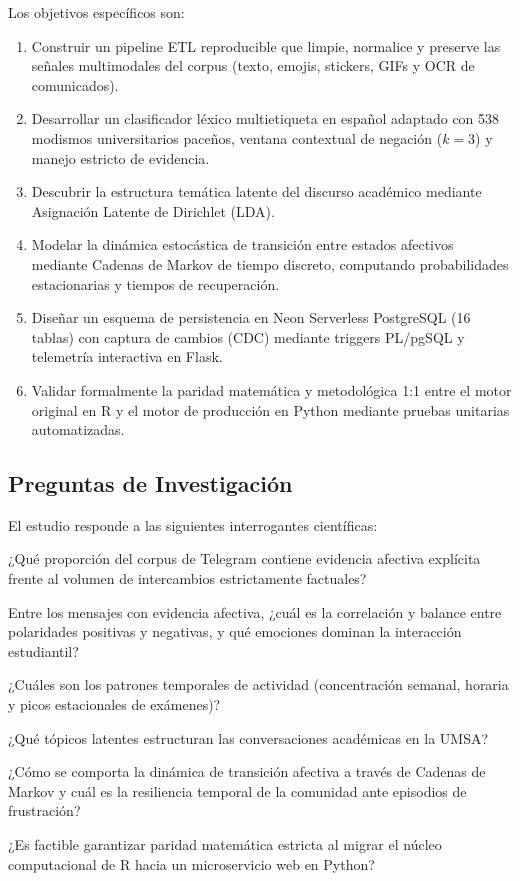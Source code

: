 Los objetivos específicos son:
\begin{enumerate}[label=\textbf{O\arabic*.}]
  \item Construir un pipeline ETL reproducible que limpie, normalice y preserve las señales multimodales del corpus (texto, emojis, stickers, GIFs y OCR de comunicados).
  \item Desarrollar un clasificador léxico multietiqueta en español adaptado con 538 modismos universitarios paceños, ventana contextual de negación ($k=3$) y manejo estricto de evidencia.
  \item Descubrir la estructura temática latente del discurso académico mediante Asignación Latente de Dirichlet (LDA).
  \item Modelar la dinámica estocástica de transición entre estados afectivos mediante Cadenas de Markov de tiempo discreto, computando probabilidades estacionarias y tiempos de recuperación.
  \item Diseñar un esquema de persistencia en Neon Serverless PostgreSQL (16 tablas) con captura de cambios (CDC) mediante triggers PL/pgSQL y telemetría interactiva en Flask.
  \item Validar formalmente la paridad matemática y metodológica 1:1 entre el motor original en R y el motor de producción en Python mediante pruebas unitarias automatizadas.
\end{enumerate}

\subsection{Preguntas de Investigación}

El estudio responde a las siguientes interrogantes científicas:
\begin{description}[style=nextline,leftmargin=1.2cm]
  \item[PI1.] ¿Qué proporción del corpus de Telegram contiene evidencia afectiva explícita frente al volumen de intercambios estrictamente factuales?
  \item[PI2.] Entre los mensajes con evidencia afectiva, ¿cuál es la correlación y balance entre polaridades positivas y negativas, y qué emociones dominan la interacción estudiantil?
  \item[PI3.] ¿Cuáles son los patrones temporales de actividad (concentración semanal, horaria y picos estacionales de exámenes)?
  \item[PI4.] ¿Qué tópicos latentes estructuran las conversaciones académicas en la UMSA?
  \item[PI5.] ¿Cómo se comporta la dinámica de transición afectiva a través de Cadenas de Markov y cuál es la resiliencia temporal de la comunidad ante episodios de frustración?
  \item[PI6.] ¿Es factible garantizar paridad matemática estricta al migrar el núcleo computacional de R hacia un microservicio web en Python?
\end{description}

